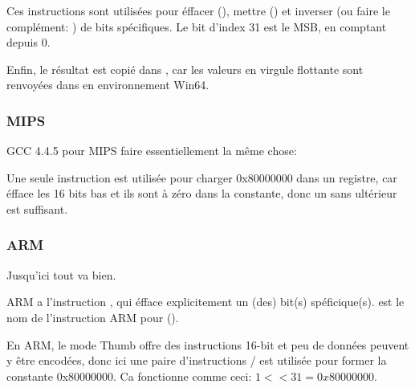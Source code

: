 Ces instructions sont utilisées pour éffacer (\BTR), mettre (\BTS) et inverser (ou
faire le complément: \BTC) de bits spécifiques.
Le bit d'index 31 est le \ac{MSB}, en comptant depuis 0.

Enfin, le résultat est copié dans , car les valeurs en virgule flottante
sont renvoyées dans  en environnement Win64.

\subsubsection{MIPS}

GCC 4.4.5 pour MIPS faire essentiellement la même chose:




Une seule instruction \LUI est utilisée pour charger 0x80000000 dans un registre,
car \LUI éfface les 16 bits bas et ils sont à zéro dans la constante, donc un \LUI
sans \ORI ultérieur est suffisant.

\subsubsection{ARM}

\myparagraph{\OptimizingKeilVI (\ARMMode)}



Jusqu'ici tout va bien.

ARM a l'instruction \BIC, qui éfface explicitement un (des) bit(s) spéficique(s).
\EOR est le nom de l'instruction ARM pour \XOR ().

\myparagraph{\OptimizingKeilVI (\ThumbMode)}



En ARM, le mode Thumb offre des instructions 16-bit et peu de données peuvent y être
encodées, donc ici une paire d'instructions / est utilisée pour
former la constante 0x80000000.
Ca fonctionne comme ceci: $1<<31 = 0x80000000$.


